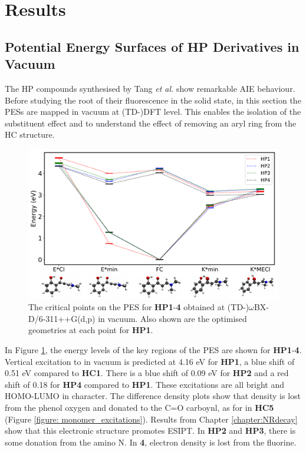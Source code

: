 \section{Results}\label{section: Connecting_Results}
\subsection{Potential Energy Surfaces of \textbf{HP} Derivatives in Vacuum} \label{section: Connecting_Vacuum}
The \acf{HP} compounds synthesised by Tang \textit{et al.} show remarkable \ac{AIE} behaviour.  Before studying the root of their fluorescence in the solid state, in this section the \acp{PES} are mapped in vacuum at (TD-)DFT level. This enables the isolation of the substituent effect and to understand the effect of removing an aryl ring from the \ac{HC} structure. 
\begin{figure}[t]
\centering
  \includegraphics[width=0.8\linewidth]{5ConnectingCrystalStructure/2HP_energies_vac.pdf}
  \caption[The vacuum PES of HP\textbf{1}-\textbf{4} with TDDFT]{The critical points on the \ac{PES} for \textbf{HP}\textbf{1}-\textbf{4} obtained at (TD-)$\omega$BX-D/6-311++G(d,p) in vacuum. Also shown are the optimised geometries at each point for \textbf{HP1}.}
  \label{figure: HP_energies_vac}
\end{figure}

In Figure \ref{figure: HP_energies_vac}, the energy levels of the key regions of the \ac{PES} are shown for \textbf{HP1}-\textbf{4}. Vertical excitation to \sone{} in vacuum is predicted at 4.16 eV for \textbf{HP1}, a blue shift of 0.51 eV compared to \textbf{HC1}.  There is a blue shift of 0.09 eV for \textbf{HP2} and a red shift of 0.18 for \textbf{HP4} compared to \textbf{HP1}. These excitations are all  bright and HOMO-LUMO in character. The difference density plots show that density is lost from the phenol oxygen and donated to the C=O carboynl, as for \sone{} in \textbf{HC5} (Figure \ref{figure: monomer_excitations}). Results from Chapter \ref{chapter:NRdecay} show that this electronic structure promotes ESIPT. In \textbf{HP2} and \textbf{HP3}, there is some donation from the amino N. In \textbf{4}, electron density is lost from the fluorine. 

